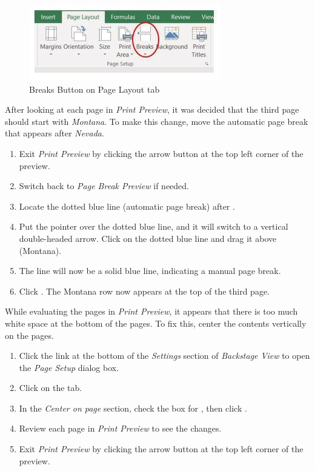 \begin{figure}[H]
	\centering
	\includegraphics[width=\maxwidth{.95\linewidth}]{gfx/ch03_fig31}
	\caption{Breaks Button on Page Layout tab}
	\label{03:fig31}
\end{figure}

After looking at each page in \textit{Print Preview}, it was decided that the third page should start with \textit{Montana}. To make this change, move the automatic page break that appears after \textit{Nevada}.

\begin{enumbox}
	\begin{enumerate}
		\item Exit \textit{Print Preview} by clicking the arrow button at the top left corner of the preview.
		\item Switch back to \textit{Page Break Preview} if needed.
		\item Locate the dotted blue line (automatic page break) after .
		\item Put the pointer over the dotted blue line, and it will switch to a vertical double-headed arrow. Click on the dotted blue line and drag it above  (Montana).
		\item The line will now be a solid blue line, indicating a manual page break.
		\item Click . The Montana row now appears at the top of the third page.
	\end{enumerate}
\end{enumbox}
	
While evaluating the pages in \textit{Print Preview}, it appears that there is too much white space at the bottom of the pages. To fix this, center the contents vertically on the pages.

\begin{enumbox}
	\begin{enumerate}
		\item Click the  link at the bottom of the \textit{Settings} section of \textit{Backstage View} to open the \textit{Page Setup} dialog box.
		\item Click on the  tab.
		\item In the \textit{Center on page} section, check the box for , then click .
		\item Review each page in \textit{Print Preview} to see the changes. 
		\item Exit \textit{Print Preview} by clicking the arrow button at the top left corner of the preview.
	\end{enumerate}
\end{enumbox}
	
